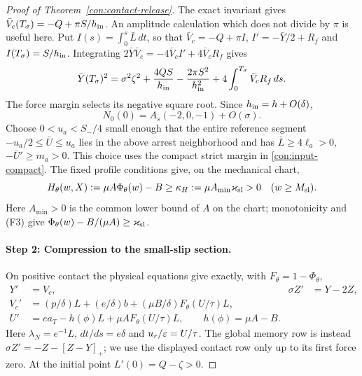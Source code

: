 \begin{proof}[Proof of Theorem~\ref{con:contact-release}]
The exact invariant gives
$\bar V_c(T_\sigma)=-Q+\pi S/h_{\rm in}$.  An amplitude calculation
which does not divide by $\pi$ is useful here.  Put
$I(s)=\int_0^s\bar L\,dt$, so that
$\bar V_c=-Q+\pi I$, $I'=-\bar Y/2+R_f$ and
$I(T_\sigma)=S/h_{\rm in}$.  Integrating
$2\bar Y\bar V_c=-4\bar V_c I'+4\bar V_cR_f$ gives
\begin{equation}
 \bar Y(T_\sigma)^2=\sigma^2\zeta^2+
 \frac{4QS}{h_{\rm in}}-\frac{2\pi S^2}{h_{\rm in}^2}
 +4\int_0^{T_\sigma}\bar V_cR_f\,ds.
 \label{con:amplitude-identity}
\end{equation}
The force margin selects its negative square root.  Since
$h_{\rm in}=h+O(\delta)$,
\begin{equation}
 N_0(0)=A_s(-2,0,-1)+O(\sigma).
 \label{con:inherited-amplitude}
\end{equation}
Choose $0<u_a<S_-/4$ small enough that the entire reference segment
$-u_a/2\le\bar U\le u_a$ lies in the above arrest neighborhood and
has $\bar L\ge4\ell_a>0$, $-\bar U'\ge m_a>0$.  This choice uses
the compact strict margin in \eqref{con:input-compact}.
The fixed profile conditions give, on the mechanical chart,
\begin{equation}
 H_\theta(w,X):=\mu A\Phi_\theta(w)-B
 \ge\kappa_H:=\mu A_{\min}\varkappa_{\rm sl}>0
 \quad(w\ge M_{\rm sl}).
 \label{con:tail-margin}
\end{equation}
Here $A_{\min}>0$ is the common lower bound of $A$ on the chart;
monotonicity and (F3) give
$\Phi_\theta(w)-B/(\mu A)\ge\varkappa_{\rm sl}$.

\paragraph{Step 2: Compression to the small-slip section.}
On positive contact the physical equations give exactly, with
$F_\theta=1-\Phi_\theta$,
\begin{equation}
 \begin{aligned}
 Y'&=V_c,&\sigma Z'&=Y-2Z,\\
 V_c'&=(p/\delta)L+(e/\delta)b
       +(\mu B/\delta)F_\theta(U/\tau)L,\\
 U'&=ea_T-h(\phi)L+\mu AF_\theta(U/\tau)L,
 \qquad h(\phi)=\mu A-B.
 \end{aligned}
 \label{con:actual-compression}
\end{equation}
Here $\lambda_N=e^{-1}L$, $dt/ds=e\delta$ and
$u_r/\varepsilon=U/\tau$.  The global memory row is instead
$\sigma Z'=-Z-[Z-Y]_+$; we use the displayed contact row only up to
its first force zero.  At the initial point $L'(0)=Q-\zeta>0$.


\end{proof}

